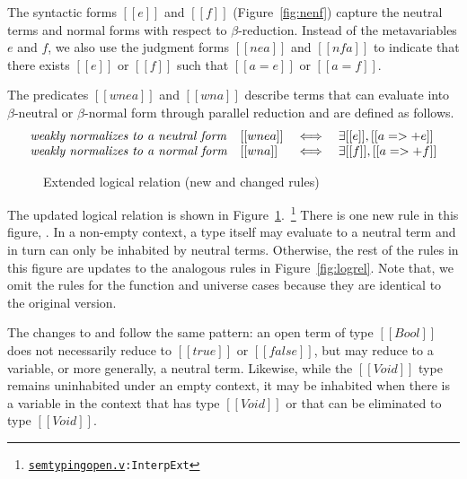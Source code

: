 \documentclass[acmsmall,screen=true,
\ifpublic review=false\else,review=true\fi
  ,anonymous=\ifanonymous true\else false\fi]{acmart}
\newcommand{\dotv}[2]{\href{#1}{\texttt{#1}}{\texttt{:#2}}}
\newcommand{\scw}[1]{}
\begin{document}
The syntactic forms $[[e]]$ and $[[f]]$ (Figure~\ref{fig:nenf}) capture the
neutral terms and normal forms with respect to $\beta$-reduction\scw{Why not say parallel reduction here? We can be specific and say that that the only reductions available for these terms are identity reductions and cite
\footnote{\dotv{normalform.v}{nf\_refl}} }. Instead of the
metavariables $e$ and $f$, we also
use the judgment forms $[[ne a]]$ and $[[nf a]]$ to indicate that there exists
$[[e]]$ or $[[f]]$ such that $[[a = e]]$ or $[[a = f]]$.

The predicates $[[wne a]]$ and $[[wn
a]]$ describe terms that can evaluate into $\beta$-neutral or
$\beta$-normal form through parallel reduction and are defined as
follows.
\[
\begin{array}{llcl}
\mbox{\emph{weakly normalizes to a neutral form}} & [[wne a]] &\iff& \exists [[e]], [[a =>+ e]] \\
\mbox{\emph{weakly normalizes to a normal form}}  & [[wn a]]  &\iff& \exists [[f]], [[a =>+ f]] \\
\end{array}
\]

\begin{figure}[h]
  \caption{Extended logical relation (new and changed rules) }
  \label{fig:logrelopen}
\end{figure}

The updated logical relation is shown in
Figure~\ref{fig:logrelopen}.~\footnote{\dotv{semtypingopen.v}{InterpExt}}
There is one new rule in this figure, . In a non-empty context, a
type itself may evaluate to a neutral term and in turn can only be inhabited
by neutral terms.  Otherwise, the rest of the rules in this figure are updates
to the analogous rules in Figure~\ref{fig:logrel}. Note that, we omit the
rules for the function and universe cases because they are identical to the
original version.

The changes to  and 
follow the same pattern: an open term of type $[[Bool]]$ does not necessarily
reduce to $[[true]]$ or $[[false]]$, but may reduce to a variable, or more
generally, a neutral term. Likewise, while the $[[Void]]$ type remains
uninhabited under an empty context, it may be inhabited when there is a
variable in the context that has type $[[Void]]$ or that can be eliminated to
type $[[Void]]$.
\end{document}
